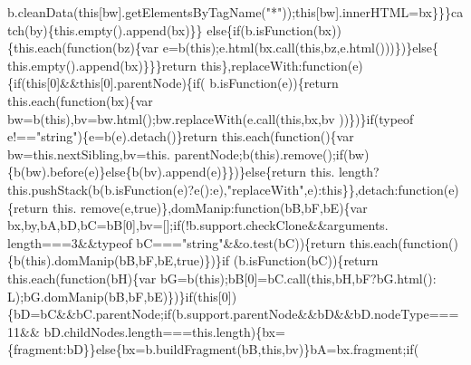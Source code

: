 \begin{DoxyCode}
      b.cleanData(\textcolor{keyword}{this}[bw].getElementsByTagName(\textcolor{stringliteral}{"*"}));\textcolor{keyword}{this}[bw].innerHTML=bx\}\}\}\textcolor{keywordflow}{catch}(by)\{this.empty().append(bx)\}\}\textcolor{keywordflow}{
      else}\{\textcolor{keywordflow}{if}(b.isFunction(bx))\{this.each(\textcolor{keyword}{function}(bz)\{var e=b(\textcolor{keyword}{this});e.html(bx.call(\textcolor{keyword}{this},bz,e.html()))\})\}\textcolor{keywordflow}{else}\{
      this.empty().append(bx)\}\}\}\textcolor{keywordflow}{return} \textcolor{keyword}{this}\},replaceWith:\textcolor{keyword}{function}(e)\{\textcolor{keywordflow}{if}(\textcolor{keyword}{this}[0]&&\textcolor{keyword}{this}[0].parentNode)\{\textcolor{keywordflow}{if}(
      b.isFunction(e))\{\textcolor{keywordflow}{return} this.each(\textcolor{keyword}{function}(bx)\{var bw=b(\textcolor{keyword}{this}),bv=bw.html();bw.replaceWith(e.call(\textcolor{keyword}{this},bx,bv
      ))\})\}\textcolor{keywordflow}{if}(typeof e!==\textcolor{stringliteral}{"string"})\{e=b(e).detach()\}\textcolor{keywordflow}{return} this.each(\textcolor{keyword}{function}()\{var bw=this.nextSibling,bv=this.
      parentNode;b(\textcolor{keyword}{this}).remove();\textcolor{keywordflow}{if}(bw)\{b(bw).before(e)\}\textcolor{keywordflow}{else}\{b(bv).append(e)\}\})\}\textcolor{keywordflow}{else}\{\textcolor{keywordflow}{return} this.
      length?this.pushStack(b(b.isFunction(e)?e():e),\textcolor{stringliteral}{"replaceWith"},e):this\}\},detach:function(e)\{\textcolor{keywordflow}{return} this.\textcolor{keyword}{
      remove}(e,\textcolor{keyword}{true})\},domManip:\textcolor{keyword}{function}(bB,bF,bE)\{var bx,by,bA,bD,bC=bB[0],bv=[];\textcolor{keywordflow}{if}(!b.support.checkClone&&arguments.
      length===3&&typeof bC===\textcolor{stringliteral}{"string"}&&o.test(bC))\{\textcolor{keywordflow}{return} this.each(\textcolor{keyword}{function}()\{b(\textcolor{keyword}{this}).domManip(bB,bF,bE,\textcolor{keyword}{true})\})\}\textcolor{keywordflow}{if}
      (b.isFunction(bC))\{\textcolor{keywordflow}{return} this.each(\textcolor{keyword}{function}(bH)\{var bG=b(\textcolor{keyword}{this});bB[0]=bC.call(\textcolor{keyword}{this},bH,bF?bG.html():
      L);bG.domManip(bB,bF,bE)\})\}\textcolor{keywordflow}{if}(\textcolor{keyword}{this}[0])\{bD=bC&&bC.parentNode;\textcolor{keywordflow}{if}(b.support.parentNode&&bD&&bD.nodeType===11&&
      bD.childNodes.length===\textcolor{keyword}{this}.length)\{bx=\{fragment:bD\}\}\textcolor{keywordflow}{else}\{bx=b.buildFragment(bB,\textcolor{keyword}{this},bv)\}bA=bx.fragment;\textcolor{keywordflow}{if}(

\end{DoxyCode}
